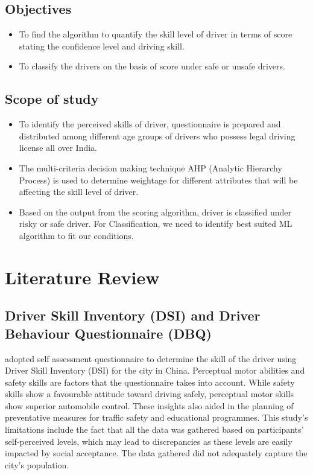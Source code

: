\documentclass[12pt,letterpaper]{report}
\begin{document}
\section{Objectives}
\renewcommand\labelitemi{$\vcenter{\hbox{\small$\bullet$}}$}
\begin{itemize}
\item To find the algorithm to quantify the skill level of driver in terms of score stating the confidence level and driving skill.
\item To classify the drivers on the basis of score under safe or unsafe drivers. 
\end{itemize}

\section{Scope of study}
\renewcommand\labelitemi{$\vcenter{\hbox{\small$\bullet$}}$}
\begin{itemize}
\item To identify the perceived skills of driver, questionnaire is prepared and distributed among different age groups of drivers who possess legal driving license all over India.
\item The multi-criteria decision making technique AHP (Analytic Hierarchy Process) is used to determine weightage for different attributes that will be affecting the skill level of driver. 
\item Based on the output from the scoring algorithm, driver is classified under risky or safe driver. For Classification, we need to identify best suited ML algorithm to fit our conditions. 
\end{itemize}

\chapter{Literature Review}
\section{Driver Skill Inventory (DSI) and Driver Behaviour Questionnaire (DBQ)}
\textbf{\cite{xu2018relationship}} adopted self assessment questionnaire to determine the skill of the driver using Driver Skill Inventory (DSI) for the city in China. Perceptual motor abilities and safety skills are factors that the questionnaire takes into account. While safety skills show a favourable attitude toward driving safely, perceptual motor skills show superior automobile control. These insights also aided in the planning of preventative measures for traffic safety and educational programmes. This study's limitations include the fact that all the data was gathered based on participants' self-perceived levels, which may lead to discrepancies as these levels are easily impacted by social acceptance. The data gathered did not adequately capture the city's population.\\
\end{document}
